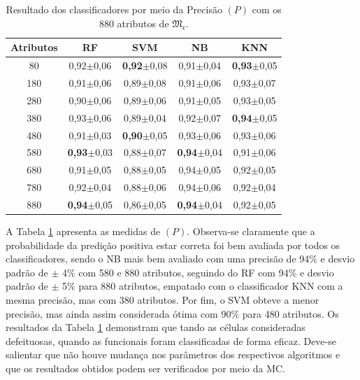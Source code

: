 \documentclass[a4paper]{ifacconf}
\begin{document}
\begin{table}[h]	
	\centering
	\caption{Resultado dos classificadores por meio da Precisão $(P)$ com os 880 atributos de $\mathfrak{M_c}$.}\label{tab:04}
		\begin{tabular}{ccccc} \hline
			    \textbf{Atributos} & \textbf{RF} & \textbf{SVM} & \textbf{NB} & \textbf{KNN}\\ \hline
			 80 & 0,92$\pm$0,06 & \textbf{0,92}$\pm$0,08 & 0,91$\pm$0,04 & \textbf{0,93}$\pm$0,05 \\
			180 & 0,91$\pm$0,06 & 0,89$\pm$0,08 & 0,91$\pm$0,06 & 0,93$\pm$0,07 \\
			280 & 0,90$\pm$0,06 & 0,89$\pm$0,06 & 0,91$\pm$0,05 & 0,93$\pm$0,05 \\
			380 & 0,93$\pm$0,06 & 0,89$\pm$0,04 & 0,92$\pm$0,07 & \textbf{0,94}$\pm$0,05 \\
			480 & 0,91$\pm$0,03 & \textbf{0,90}$\pm$0,05 & 0,93$\pm$0,06 & 0,93$\pm$0,06 \\
			580 & \textbf{0,93}$\pm$0,03 & 0,88$\pm$0,07 & \textbf{0,94}$\pm$0,04 & 0,91$\pm$0,06 \\
			680 & 0,91$\pm$0,05 & 0,88$\pm$0,05 & 0,94$\pm$0,05 & 0,92$\pm$0,05 \\
			780 & 0,92$\pm$0,04 & 0,88$\pm$0,06 & 0,94$\pm$0,06 & 0,92$\pm$0,04 \\
			880 & \textbf{0,94}$\pm$0,05 & 0,86$\pm$0,05 & \textbf{0,94}$\pm$0,04 & 0,92$\pm$0,05 \\
			\hline
		\end{tabular}
\end{table}

A Tabela \ref{tab:04} apresenta as medidas de $(P)$. Observa-se claramente que a probabilidade da predição positiva estar correta foi bem avaliada por todos os classificadores, sendo o NB mais bem avaliado com uma precisão de 94\% e desvio padrão de $\pm$ 4\% com 580 e 880 atributos, seguindo do RF com 94\% e desvio padrão de $\pm$ 5\% para 880 atributos, empatado com o classificador KNN com a mesma precisão, mas com 380 atributos. Por fim, o SVM obteve a menor precisão, mas ainda assim considerada ótima com 90\% para 480 atributos. Os resultados da Tabela \ref{tab:04} demonstram que tando as células consideradas defeituosas, quando as funcionais foram classificadas de forma eficaz. Deve-se salientar que não houve mudança nos parâmetros dos respectivos algoritmos e que os resultados obtidos podem ser verificados por meio da MC.
\end{document}

